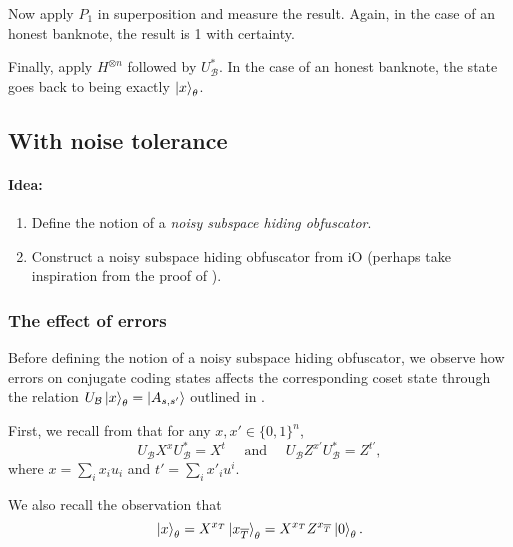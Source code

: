 \documentclass[12pt,letterpaper]{article}
\theoremstyle{definition}
\theoremstyle{remark}
\begin{document}
Now apply $P_1$ in superposition and measure the result. Again, in the case of an honest banknote, the result is 1 with certainty.

Finally, apply $H^{\otimes n}$ followed by $U^*_{\mathcal{B}}$. In the case of an honest banknote, the state goes back to being exactly $\ket{x}_\theta$.

\subsection{With noise tolerance}

\paragraph{Idea:}
\begin{enumerate}
    \item Define the notion of a \emph{noisy subspace hiding obfuscator}.
    \item Construct a noisy subspace hiding obfuscator from iO (perhaps take inspiration from the proof of ).
\end{enumerate}


\subsubsection{The effect of errors}
Before defining the notion of a noisy subspace hiding obfuscator, we observe how errors on conjugate coding states affects the corresponding coset state through the relation $U_{\mathcal{B}}\ket{x}_\theta=\ket{A_{s,s'}}$ outlined in .

First, we recall from \cite{CV21arxiv} that for any $x,x' \in \{0,1\}^n$,
\begin{equation}
\label{permuteBasisEffect}
    U_{\mathcal{B}} X^x U^*_{\mathcal{B}} = X^t \quad \text{ and } \quad U_{\mathcal{B}} Z^{x'} U^*_{\mathcal{B}} = Z^{t'},
\end{equation}
where $x=\sum_i x_i u_i$ and $t'= \sum_i x'_i u^i$.

We also recall the observation that
\begin{equation*}
    \ket{x}_\theta = X^{x_T} \ket{x_{\overline{T}}}_{\theta} = X^{x_T} Z^{x_{\overline{T}}} \ket{0}_\theta.
\end{equation*}
\end{document}
